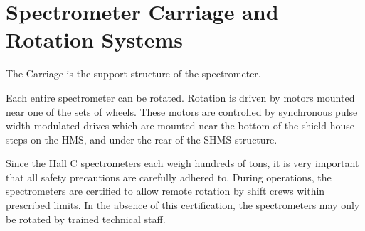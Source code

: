 \section{Spectrometer Carriage and Rotation Systems}

The Carriage is the support structure of the spectrometer.

Each entire spectrometer can be rotated. Rotation is driven by motors mounted
near one of the sets of wheels. These motors are controlled by synchronous
pulse width modulated drives which are mounted near the bottom of the shield
house steps on the HMS, and under the rear of the SHMS structure.


Since the Hall C spectrometers each weigh hundreds of
tons, it is very important that all safety precautions are carefully
adhered to.   During operations, the spectrometers are certified
to allow remote rotation by shift crews within prescribed limits.  In
the absence of this certification, the spectrometers may only be
rotated by trained technical staff.


